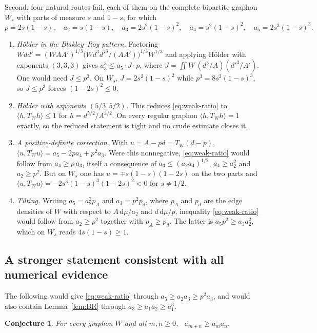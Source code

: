 \documentclass[11pt]{article}
\newtheorem{conjecture}[theorem]{Conjecture}
\newcommand{\dd}{\,\mathrm d}
\begin{document}
Second, four natural routes fail, each of them on the complete bipartite
graphon $W_s$ with parts of measure $s$ and $1-s$, for which
\[
 p=2s(1-s),\quad a_2=s(1-s),\quad a_3=2s^2(1-s)^2,\quad
 a_4=s^2(1-s)^2,\quad a_5=2s^3(1-s)^3 .
\]

\begin{enumerate}
\item \emph{H\"older in the Blakley--Roy pattern.}  Factoring
 $Wdd'=(WAA')^{1/3}\bigl(Wd^3d'^3/(AA')\bigr)^{1/3}W^{1/3}$ and applying
 H\"older with exponents $(3,3,3)$ gives $a_3^3\leq a_5\cdot J\cdot p$, where
 $J=\iint W\,(d^3/A)(d'^3/A')$.  One would need $J\leq p^3$.  On $W_s$,
 $J=2s^2(1-s)^2$ while $p^3=8s^3(1-s)^3$, so $J\leq p^3$ forces
 $(1-2s)^2\leq0$.
\item \emph{H\"older with exponents $(5/3,5/2)$.}  This reduces
 \eqref{eq:weak-ratio} to $\langle h,T_Wh\rangle\leq1$ for
 $h=d^{5/2}/A^{3/2}$.  On every regular graphon $\langle h,T_Wh\rangle=1$
 exactly, so the reduced statement is tight and no crude estimate closes it.
\item \emph{A positive-definite correction.}  With $u=A-pd=T_W(d-p)$,
 $\langle u,T_Wu\rangle=a_5-2pa_4+p^2a_3$.  Were this nonnegative,
 \eqref{eq:weak-ratio} would follow from $a_4\geq p\,a_3$, itself a
 consequence of $a_3\leq(a_2a_4)^{1/2}$, $a_4\geq a_2^2$ and $a_2\geq p^2$.
 But on $W_s$ one has $u=\mp s(1-s)(1-2s)$ on the two parts and
 $\langle u,T_Wu\rangle=-2s^3(1-s)^3(1-2s)^2<0$ for $s\neq1/2$.
\item \emph{Tilting.}  Writing $a_5=a_2^2p_A$ and $a_3=p^2p_d$, where $p_A$
 and $p_d$ are the edge densities of $W$ with respect to $A\dd\mu/a_2$ and
 $d\dd\mu/p$, inequality \eqref{eq:weak-ratio} would follow from $a_2\geq p^2$
 together with $p_A\geq p_d$.  The latter is $a_5p^2\geq a_3a_2^2$, which on
 $W_s$ reads $4s(1-s)\geq1$.
\end{enumerate}

\subsection{A stronger statement consistent with all numerical evidence}
\label{sec:supermult}

The following would give \eqref{eq:weak-ratio} through
$a_5\geq a_2a_3\geq p^2a_3$, and would also contain Lemma~\ref{lem:BR} through
$a_3\geq a_1a_2\geq a_1^3$.

\begin{conjecture}
\label{conj:supermult}
For every graphon $W$ and all $m,n\geq0$, \ $a_{m+n}\geq a_ma_n$.
\end{conjecture}
\end{document}
